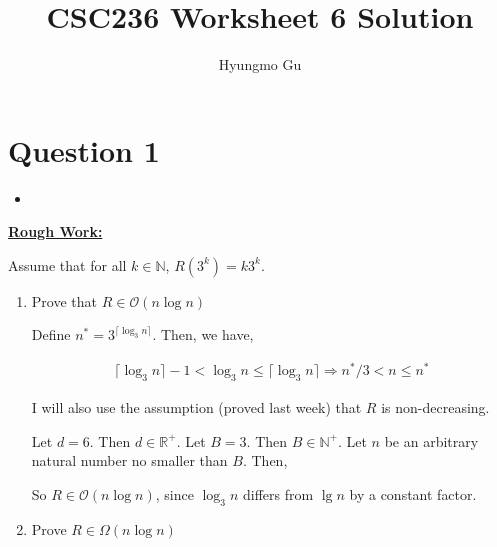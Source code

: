 \documentclass[12pt]{article}
\begin{document}
\title{CSC236 Worksheet 6 Solution}
\author{Hyungmo Gu}
\maketitle

\section*{Question 1}
\begin{itemize}
    \item

\end{itemize}

\bigskip

\begin{mdframed}
    \underline{\textbf{Rough Work:}}

    \bigskip

    Assume that for all $k \in \mathbb{N}$, $R(3^k) = k3^k$.

    \begin{enumerate}[1.]
        \item Prove that $R \in \mathcal{O}(n \log n)$

        \bigskip

        Define $n^* = 3^{\lceil \log_3 n \rceil}$. Then, we have,

        \begin{align}
            \lceil \log_3 n \rceil - 1 < \log_3 n \leq \lceil \log_3 n \rceil \Rightarrow n^*/3 < n \leq n^*
        \end{align}

        I will also use the assumption (proved last week) that $R$ is non-decreasing.

        \bigskip

        Let $d = 6$. Then $d \in \mathbb{R}^+$. Let $B = 3$. Then $B \in \mathbb{N}^+$. Let
        $n$ be an arbitrary natural number no smaller than $B$. Then,

        \begin{mdframed}

        \end{mdframed}

        So $R \in \mathcal{O}(n \log n)$, since $\log_3 n$ differs from $\lg n$ by a constant factor.

        \item Prove $R \in \Omega(n \log n)$

        \begin{mdframed}

        \end{mdframed}
    \end{enumerate}

\end{mdframed}
\end{document}

